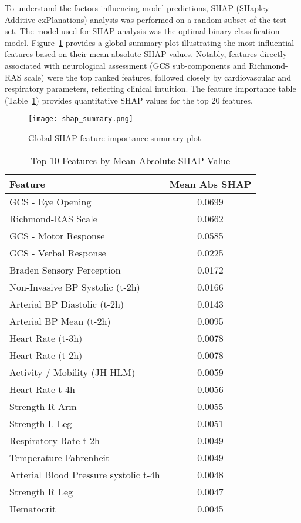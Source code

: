 \documentclass[conference]{IEEEtran}
\begin{document}
To understand the factors influencing model predictions, SHAP (SHapley Additive exPlanations) analysis was performed on a random subset of the test set. The model used for SHAP analysis was the optimal binary classification model. Figure~\ref{fig:shap_summary} provides a global summary plot illustrating the most influential features based on their mean absolute SHAP values. Notably, features directly associated with neurological assessment (GCS sub-components and Richmond-RAS scale) were the top ranked features, followed closely by cardiovascular and respiratory parameters, reflecting clinical intuition. The feature importance table (Table~\ref{tab:feature_importance}) provides quantitative SHAP values for the top 20 features.

\begin{figure}[htbp] \centering \texttt{[image: shap\_summary.png]} \caption{Global SHAP feature importance summary plot} \label{fig:shap_summary} \end{figure}

\begin{table}[htbp]
\centering
\caption{Top 10 Features by Mean Absolute SHAP Value}
\label{tab:feature_importance}
\begin{tabular}{lc}
\hline
\textbf{Feature} & \textbf{Mean Abs SHAP} \\
\hline
GCS - Eye Opening & 0.0699 \\
Richmond-RAS Scale & 0.0662 \\
GCS - Motor Response & 0.0585 \\
GCS - Verbal Response & 0.0225 \\
Braden Sensory Perception & 0.0172 \\
Non-Invasive BP Systolic (t-2h) & 0.0166 \\
Arterial BP Diastolic (t-2h) & 0.0143 \\
Arterial BP Mean (t-2h) & 0.0095 \\
Heart Rate (t-3h) & 0.0078 \\
Heart Rate (t-2h) & 0.0078 \\
Activity / Mobility (JH-HLM) & 0.0059 \\
Heart Rate t-4h & 0.0056 \\
Strength R Arm & 0.0055 \\
Strength L Leg & 0.0051 \\
Respiratory Rate t-2h & 0.0049 \\
Temperature Fahrenheit & 0.0049 \\
Arterial Blood Pressure systolic t-4h & 0.0048 \\
Strength R Leg & 0.0047 \\
Hematocrit & 0.0045 \\
\hline
\end{tabular}
\end{table}
\end{document}
